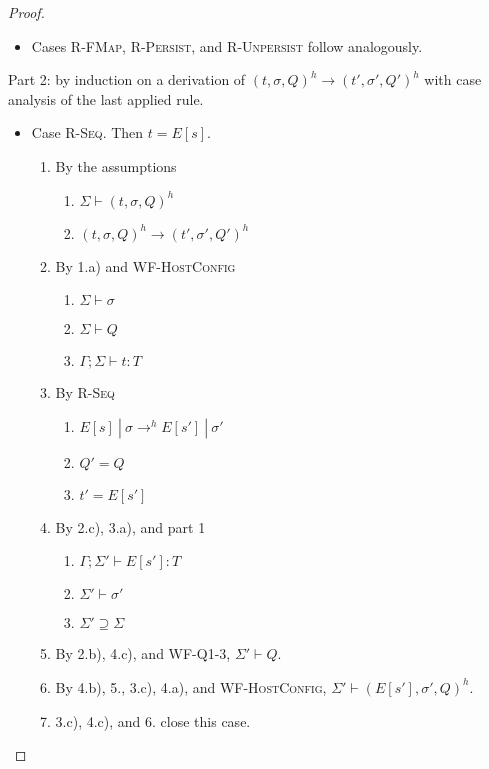 \documentclass{article}
\theoremstyle{definition}
\begin{document}
\begin{proof}
\begin{itemize}
\item Cases \textsc{R-FMap}, \textsc{R-Persist}, and \textsc{R-Unpersist} follow analogously.
\end{itemize}

% 
Part 2: by induction on a derivation of $(t, \sigma, Q)^h \longrightarrow (t', \sigma', Q')^h$ with case analysis of the last applied rule.

\begin{itemize}

\item Case \textsc{R-Seq}. Then $t = E[s]$.
\begin{enumerate}
\item By the assumptions
  \begin{enumerate}[label=(\alph*)]
  \item $\Sigma \vdash (t, \sigma, Q)^h$
  \item $(t, \sigma, Q)^h \longrightarrow (t', \sigma', Q')^h$
  \end{enumerate}
\item By 1.a) and \textsc{WF-HostConfig}
  \begin{enumerate}[label=(\alph*)]
  \item $\Sigma \vdash \sigma$
  \item $\Sigma \vdash Q$
  \item $\Gamma ; \Sigma \vdash t : T$
  \end{enumerate}
\item By \textsc{R-Seq}
  \begin{enumerate}[label=(\alph*)]
  \item $E[s]~|~\sigma \rightarrow^h E[s']~|~\sigma'$
  \item $Q' = Q$
  \item $t' = E[s']$
  \end{enumerate}
\item By 2.c), 3.a), and part 1
  \begin{enumerate}[label=(\alph*)]
  \item $\Gamma ; \Sigma' \vdash E[s'] : T$
  \item $\Sigma' \vdash \sigma'$
  \item $\Sigma' \supseteq \Sigma$
  \end{enumerate}
\item By 2.b), 4.c), and \textsc{WF-Q1-3}, $\Sigma' \vdash Q$.
\item By 4.b), 5., 3.c), 4.a), and \textsc{WF-HostConfig}, $\Sigma' \vdash (E[s'], \sigma', Q)^h$.
\item 3.c), 4.c), and 6. close this case.
\end{enumerate}


\end{itemize}
\end{proof}
\end{document}
